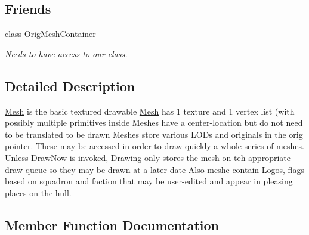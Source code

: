 \subsection*{Friends}
\begin{DoxyCompactItemize}
\item 
class \hyperlink{classMesh_a82aef8bd526391fe75e64b50ab0cc688}{Orig\+Mesh\+Container}\hypertarget{classMesh_a82aef8bd526391fe75e64b50ab0cc688}{}\label{classMesh_a82aef8bd526391fe75e64b50ab0cc688}

\begin{DoxyCompactList}\small\item\em Needs to have access to our class. \end{DoxyCompactList}\end{DoxyCompactItemize}


\subsection{Detailed Description}
\hyperlink{classMesh}{Mesh} is the basic textured drawable \hyperlink{classMesh}{Mesh} has 1 texture and 1 vertex list (with possibly multiple primitives inside Meshes have a center-\/location but do not need to be translated to be drawn Meshes store various L\+OD\textquotesingle{}s and originals in the orig pointer. These may be accessed in order to draw quickly a whole series of meshes. Unless Draw\+Now is invoked, Drawing only stores the mesh on teh appropriate draw queue so they may be drawn at a later date Also meshe contain Logos, flags based on squadron and faction that may be user-\/edited and appear in pleasing places on the hull. 

\subsection{Member Function Documentation}
